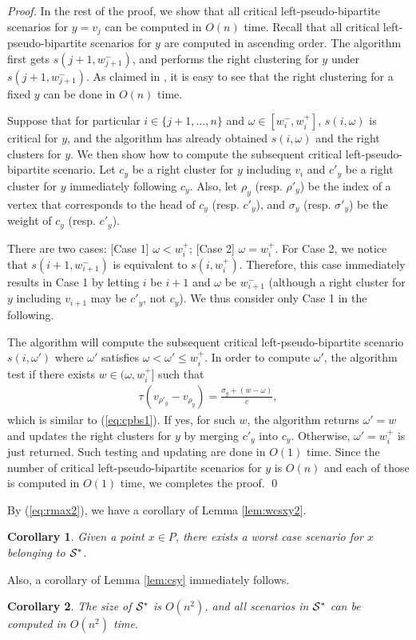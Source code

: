 \documentclass[a4paper]{llncs}
\newtheorem{coro}{Corollary}
\begin{document}
\begin{proof}
In the rest of the proof, we show that all critical left-pseudo-bipartite scenarios for $y = v_j$ can be computed in $O(n)$ time.
Recall that all critical left-pseudo-bipartite scenarios for $y$ are computed in ascending order.
The algorithm first gets $s(j+1, w^-_{j+1})$,
and performs the right clustering for $y$ under $s(j+1, w^-_{j+1})$.
As claimed in \cite{hgk14_2,hgk14_4}, it is easy to see that the right clustering for a fixed $y$ can be done in $O(n)$ time.



Suppose that for particular $i \in \{j+1, \ldots, n\}$ and $\omega \in [w^-_i, w^+_i]$, $s(i, \omega)$ is critical for $y$,
and the algorithm has already obtained $s(i, \omega)$ and the right clusters for $y$.
We then show how to compute the subsequent critical left-pseudo-bipartite scenario.
Let $c_y$ be a right cluster for $y$ including $v_i$ and $c'_y$ be a right cluster for $y$ immediately following $c_y$.
Also, let $\rho_y$ (resp. $\rho'_y$) be the index of a vertex that corresponds to the head of $c_y$ (resp. $c'_y$),
and $\sigma_y$ (resp. $\sigma'_y$) be the weight of $c_y$ (resp. $c'_y$).

There are two cases: 
[Case 1] $\omega < w^+_i$; 
[Case 2] $\omega = w^+_i$.
For Case 2,
we notice that $s(i+1, w^-_{i+1})$ is equivalent to $s(i, w^+_i)$.
Therefore, this case immediately results in Case 1 by letting $i$ be $i+1$ and $\omega$ be $w^-_{i+1}$
(although a right cluster for $y$ including $v_{i+1}$ may be $c'_y$, not $c_y$).
We thus consider only Case 1 in the following.

The algorithm will compute the subsequent critical left-pseudo-bipartite scenario $s(i, \omega')$
where $\omega'$ satisfies $\omega < \omega' \le w^+_i$.
In order to compute $\omega'$, the algorithm test if there exists $w \in (\omega, w^+_i]$ such that
\begin{eqnarray}
\tau(v_{\rho'_y}-v_{\rho_y})=\frac{\sigma_y + (w - \omega)}{c},
\label{eq:lem1.23}
\end{eqnarray}
which is similar to (\ref{eq:cpbs1}).
If yes, for such $w$, the algorithm returns $\omega'=w$ and updates the right clusters for $y$ by merging $c'_y$ into $c_y$.
Otherwise, $\omega'=w^+_i$ is just returned. 
Such testing and updating are done in $O(1)$ time.
Since the number of critical left-pseudo-bipartite scenarios for $y$ is $O(n)$ and each of those is computed in $O(1)$ time,
we completes the proof.
\qed
\end{proof}
By (\ref{eq:rmax2}), we have a corollary of Lemma \ref{lem:wcsxy2}.
\begin{coro}
Given a point $x \in P$, there exists a worst case scenario for $x$ belonging to ${\cal S}^*$.
\label{coro:wcsx}
\end{coro}
Also, a corollary of Lemma \ref{lem:csy} immediately follows.
\begin{coro}
The size of ${\cal S}^*$ is $O(n^2)$,
and all scenarios in ${\cal S}^*$ can be computed in $O(n^2)$ time.
\label{coro:cusy}
\end{coro}
\end{document}
